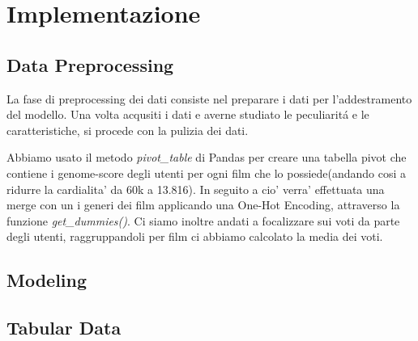 \documentclass[../../Report.tex]{subfiles}
\begin{document}
\chapter{Implementazione}
\section{Data Preprocessing}
La fase di preprocessing dei dati consiste nel preparare i dati per l'addestramento del modello.
Una volta acqusiti i dati e averne studiato le peculiaritá e le caratteristiche, si procede con la pulizia dei dati.

Abbiamo usato il metodo \textit{pivot\_table} di Pandas per creare una tabella pivot che contiene i genome-score degli utenti per ogni film che lo possiede(andando cosi a ridurre la cardialita' da 60k a 13.816).
In seguito a cio' verra' effettuata una merge con un i generi dei film applicando una One-Hot Encoding, attraverso la funzione \textit{get\_dummies()}.
Ci siamo inoltre andati a focalizzare sui voti da parte degli utenti, raggruppandoli per film ci abbiamo calcolato la media dei voti.

\section{Modeling}

\section*{Tabular Data}
\end{document}
